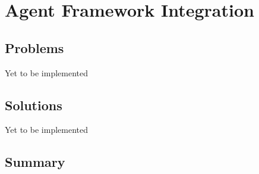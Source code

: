 \chapter{Agent Framework Integration}
\label{mainthree}

\section{Problems}
    Yet to be implemented
\section{Solutions}
    Yet to be implemented
\section{Summary}
    